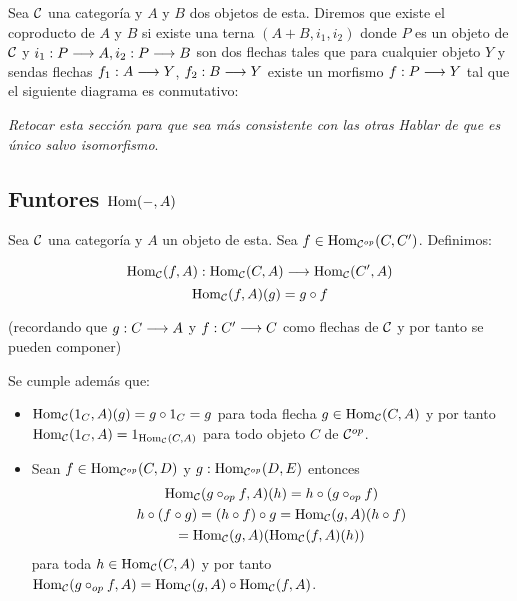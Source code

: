 \begin{definition}
Sea $\mathcal{C}$ una categoría y $A$ y $B$ dos objetos de esta. Diremos que
existe el coproducto de $A$ y $B$
si existe una terna $(A+B, i_1, i_2)$
donde $P$ es un objeto de $\mathcal{C}$ y
$i_1 : P\longrightarrow A, i_2 : P\longrightarrow B$ son dos flechas tales
que para cualquier objeto $Y$ y sendas flechas $f_1 : A\longrightarrow Y$,
$f_2 : B\longrightarrow Y$ existe un morfismo
$f : P\longrightarrow Y$ tal que el siguiente diagrama es conmutativo:
\begin{center}
\end{center}
\end{definition}

\textit{Retocar esta sección para que sea más consistente con las otras}
\textit{Hablar de que es único salvo isomorfismo}.


\subsection{Funtores $\operatorname{Hom}(-, A)$}
Sea $\mathcal{C}$ una categoría y $A$ un objeto de esta.
Sea $f \in \operatorname{Hom}_{\mathcal{C}^{op}}(C, C')$. Definimos:

$$\Hom_{\C}(f, A) :
  \arr{
    \Hom_{\C}(C, A)
  }{
    \Hom_{\C}(C', A)
  }$$
$$\operatorname{Hom}_{\mathcal{C}}(f, A)(g) = g \circ f$$

(recordando que $g : C\longrightarrow A$ y $f : C'\longrightarrow C$ como
flechas de $\mathcal{C}$ y por tanto se pueden componer)

Se cumple además que:

\begin{itemize}
\item $\operatorname{Hom}_{\mathcal{C}}(1_C, A)(g) = g \circ 1_C = g$ para toda flecha
  $g\in \operatorname{Hom}_{\mathcal{C}}(C, A)$ y por tanto
  $\operatorname{Hom}_{\mathcal{C}}(1_C, A) = 1_{\operatorname{Hom}_{\mathcal{C}}(C, A)}$ para todo objeto $C$
  de $\mathcal{C}^{op}$.

\item Sean $f \in \operatorname{Hom}_{\mathcal{C}^{op}}(C, D)$ y $g : \operatorname{Hom}_{\mathcal{C}^{op}}(D, E)$
  entonces
  \begin{multline*}
    $$\Hom_{\C}(g \circ_{op} f, A)(h) = h \circ (g \circ_{op} f) \\
      h \circ (f \circ g) = (h \circ f) \circ g = \Hom_{\C}(g, A)(h \circ f) \\
      = \Hom_{\C}(g, A)(\Hom_{\C}(f, A)(h))$$
  \end{multline*}
  para toda $h \in \operatorname{Hom}_{\mathcal{C}}(C, A)$ y por tanto
  $\operatorname{Hom}_{\mathcal{C}}(g \circ_{op} f, A) = \operatorname{Hom}_{\mathcal{C}}(g, A) \circ \operatorname{Hom}_{\mathcal{C}}(f, A)$.
\end{itemize}


